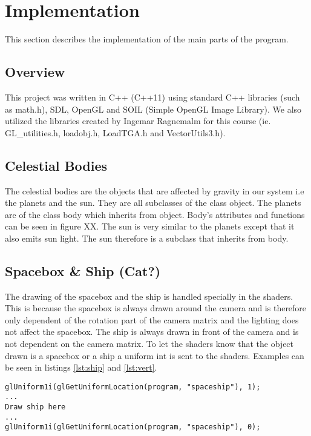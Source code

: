 \documentclass[a4paper,12pt]{article} \usepackage{graphicx}
\begin{document}
\section{Implementation}
This section describes the implementation of the main parts of the program. 
\subsection{Overview}
This project was written in C++ (C++11) using standard C++ libraries (such as
math.h), SDL, OpenGL and SOIL (Simple OpenGL Image Library). We also utilized the libraries created
by Ingemar Ragnemalm for this course (ie. GL\_utilities.h, loadobj.h, LoadTGA.h
and VectorUtils3.h).
\subsection{Celestial Bodies}
The celestial bodies are the objects that are affected by gravity in our system
i.e the planets and the sun. They are all subclasses of the class object. The
planets are of the class body which inherits from object. Body's attributes and
functions can be seen in figure XX. The sun is very similar to the planets
except that it also emits sun light. The sun therefore is a subclass that
inherits from body. 

\subsection{Spacebox \& Ship (Cat?)}
The drawing of the spacebox and the ship is handled specially in the shaders.
This is because the spacebox is always drawn around the camera and is therefore
only dependent of the rotation part of the camera matrix and the lighting does
not affect the spacebox. The ship is always drawn in front of the camera and is
not dependent on the camera matrix. To let the shaders know that the object
drawn is a spacebox or a ship a uniform int is sent to the shaders. Examples
can be seen in listings \ref{lst:ship} and \ref{lst:vert}.

\begin{lstlisting}[caption={Draw spaceship}, label={lst:ship}]
glUniform1i(glGetUniformLocation(program, "spaceship"), 1);
...
Draw ship here
...
glUniform1i(glGetUniformLocation(program, "spaceship"), 0);
\end{lstlisting}
\end{document}
